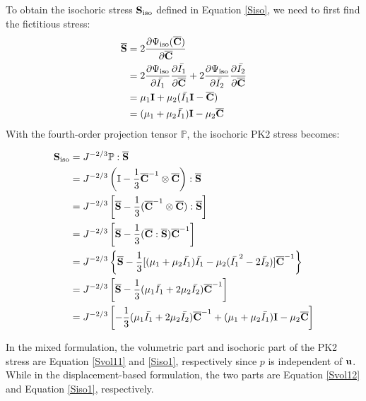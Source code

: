 To obtain the isochoric stress $\bold{S}_\mathrm{iso}$ defined in Equation \ref{Siso}, we need to first find the fictitious stress:
\begin{equation} \label{Sbar1}
\begin{split}
\overline{\bold{S}} &= 2\frac{\partial\Psi_\mathrm{iso}({\overline{\bold{C}})}}{\partial\overline{\bold{C}}} \\
&= 2\frac{\partial\Psi_\mathrm{iso}}{\partial\bar{I_1}} \frac{\partial\bar{I_1}}{\partial\overline{\bold{C}}}  + 2\frac{\partial\Psi_\mathrm{iso}}{\partial\bar{I_2}} \frac{\partial\bar{I_2}}{\partial\overline{\bold{C}}} \\
&= \mu_1{\bold{I}} + \mu_2({\bar{I_1}\bold{I} - \overline{\bold{C}}}) \\
&= (\mu_1+\mu_2\bar{I_1})\bold{I} - \mu_2{\overline{\bold{C}}}
\end{split}
\end{equation}
With the fourth-order projection tensor $\mathbb{P}$, the isochoric PK2 stress becomes:

\begin{equation} \label{Siso1}
\begin{split}
\bold{S}_\mathrm{iso}
&= J^{-2/3}\mathbb{P}:\overline{\bold{S}} \\
&= J^{-2/3}\left( \mathbb{I} - \frac{1}{3}{\overline{\bold{C}}}^{-1} \otimes \overline{\bold{C}} \right) : \overline{\bold{S}} \\
&= J^{-2/3} \left[\overline{\bold{S}} - \frac{1}{3}( \overline{\bold{C}}^{-1} \otimes \overline{\bold{C}} ) : \overline{\bold{S}} \right]  \\
&= J^{-2/3}\left[ \overline{\bold{S}} - \frac{1}{3}(\overline{\bold{C}} : \overline{\bold{S}})\overline{\bold{C}}^{-1} \right]  \\
&= J^{-2/3}\left\{ \overline{\bold{S}} - \frac{1}{3} [(\mu_1+\mu_2\bar{I_1})\bar{I_1} - \mu_2(\bar{I_1}^2-2\bar{I_2})]\overline{\bold{C}}^{-1} \right\} \\
&= J^{-2/3}\left[\overline{\bold{S}} -  \frac{1}{3}(\mu_1\bar{I_1} + 2\mu_2\bar{I_2}) \overline{\bold{C}}^{-1}\right] \\
&= J^{-2/3} \left[    - \frac{1}{3}(\mu_1\bar{I_1} + 2\mu_2\bar{I_2}) \overline{\bold{C}}^{-1}  + (\mu_1 + \mu_2\bar{I_1})\bold{I} - \mu_2\overline{\bold{C}} \right]
\end{split}
\end{equation}

In the mixed formulation, the volumetric part and isochoric part of the PK2 stress are Equation \ref{Svol11} and \ref{Siso1}, respectively since $p$ is independent of $\bold{u}$. While in the displacement-based formulation, the two parts are Equation \ref{Svol12} and Equation \ref{Siso1}, respectively.


